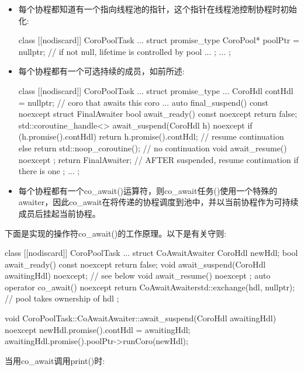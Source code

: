 \begin{itemize}
\item 
每个协程都知道有一个指向线程池的指针，这个指针在线程池控制协程时初始化:

\begin{cpp}
class [[nodiscard]] CoroPoolTask
{
	...
	struct promise_type {
		CoroPool* poolPtr = nullptr; // if not null, lifetime is controlled by pool
		...
	};
	...
};
\end{cpp}

\item 
每个协程都有一个可选持续的成员，如前所述:

\begin{cpp}
class [[nodiscard]] CoroPoolTask
{
	...
	struct promise_type {
		...
		CoroHdl contHdl = nullptr; // coro that awaits this coro
		...
		auto final_suspend() const noexcept {
			struct FinalAwaiter {
				bool await_ready() const noexcept { return false; }
				std::coroutine_handle<> await_suspend(CoroHdl h) noexcept {
					if (h.promise().contHdl) {
						return h.promise().contHdl; // resume continuation
					}
					else {
						return std::noop_coroutine(); // no continuation
					}
				}
				void await_resume() noexcept {}
			};
			return FinalAwaiter{}; // AFTER suspended, resume continuation if there is one
		}
	};
	...
};
\end{cpp}

\item 
每个协程都有一个co\_await()运算符，则co\_await任务()使用一个特殊的awaiter，因此co\_await在将传递的协程调度到池中，并以当前协程作为可持续成员后挂起当前协程。
\end{itemize}

下面是实现的操作符co\_await()的工作原理。以下是有关守则:

\begin{cpp}
class [[nodiscard]] CoroPoolTask
{
	...
	struct CoAwaitAwaiter {
		CoroHdl newHdl;
		bool await_ready() const noexcept { return false; }
		void await_suspend(CoroHdl awaitingHdl) noexcept; // see below
		void await_resume() noexcept {}
	};
	auto operator co_await() noexcept {
		return CoAwaitAwaiter{std::exchange(hdl, nullptr)}; // pool takes ownership of hdl
	}
};

void CoroPoolTask::CoAwaitAwaiter::await_suspend(CoroHdl awaitingHdl) noexcept
{
	newHdl.promise().contHdl = awaitingHdl;
	awaitingHdl.promise().poolPtr->runCoro(newHdl);
}
\end{cpp}

当用co\_await调用print()时:

